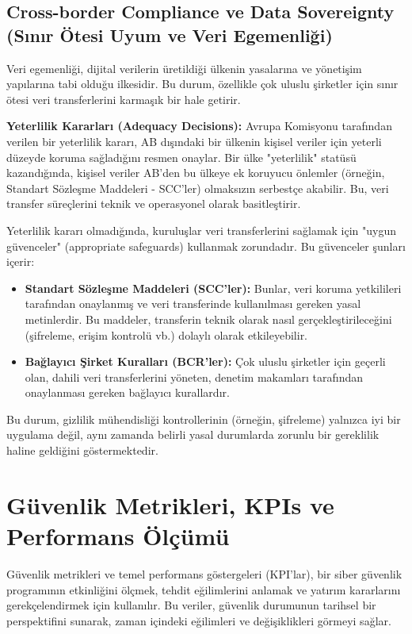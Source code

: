 \subsection{Cross-border Compliance ve Data Sovereignty (Sınır Ötesi Uyum ve Veri Egemenliği)}

Veri egemenliği, dijital verilerin üretildiği ülkenin yasalarına ve yönetişim yapılarına tabi olduğu ilkesidir. Bu durum, özellikle çok uluslu şirketler için sınır ötesi veri transferlerini karmaşık bir hale getirir.

\textbf{Yeterlilik Kararları (Adequacy Decisions):} Avrupa Komisyonu tarafından verilen bir yeterlilik kararı, AB dışındaki bir ülkenin kişisel veriler için yeterli düzeyde koruma sağladığını resmen onaylar. Bir ülke "yeterlilik" statüsü kazandığında, kişisel veriler AB'den bu ülkeye ek koruyucu önlemler (örneğin, Standart Sözleşme Maddeleri - SCC'ler) olmaksızın serbestçe akabilir. Bu, veri transfer süreçlerini teknik ve operasyonel olarak basitleştirir.

Yeterlilik kararı olmadığında, kuruluşlar veri transferlerini sağlamak için "uygun güvenceler" (appropriate safeguards) kullanmak zorundadır. Bu güvenceler şunları içerir:
\begin{itemize}
    \item \textbf{Standart Sözleşme Maddeleri (SCC'ler):} Bunlar, veri koruma yetkilileri tarafından onaylanmış ve veri transferinde kullanılması gereken yasal metinlerdir. Bu maddeler, transferin teknik olarak nasıl gerçekleştirileceğini (şifreleme, erişim kontrolü vb.) dolaylı olarak etkileyebilir.
    \item \textbf{Bağlayıcı Şirket Kuralları (BCR'ler):} Çok uluslu şirketler için geçerli olan, dahili veri transferlerini yöneten, denetim makamları tarafından onaylanması gereken bağlayıcı kurallardır.
\end{itemize}

Bu durum, gizlilik mühendisliği kontrollerinin (örneğin, şifreleme) yalnızca iyi bir uygulama değil, aynı zamanda belirli yasal durumlarda zorunlu bir gereklilik haline geldiğini göstermektedir.

\section{Güvenlik Metrikleri, KPIs ve Performans Ölçümü}

Güvenlik metrikleri ve temel performans göstergeleri (KPI'lar), bir siber güvenlik programının etkinliğini ölçmek, tehdit eğilimlerini anlamak ve yatırım kararlarını gerekçelendirmek için kullanılır. Bu veriler, güvenlik durumunun tarihsel bir perspektifini sunarak, zaman içindeki eğilimleri ve değişiklikleri görmeyi sağlar.

